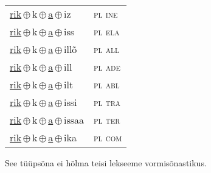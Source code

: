 \begin{minipage}{\textwidth}
\begin{sideways}
\begin{tabular}{l l}
\underline{rik}\,$\oplus$\,k\,$\oplus$\,\underline{a}\,$\oplus$\,iz & \textsc{ pl ine } \\
\underline{rik}\,$\oplus$\,k\,$\oplus$\,\underline{a}\,$\oplus$\,iss & \textsc{ pl ela } \\
\underline{rik}\,$\oplus$\,k\,$\oplus$\,\underline{a}\,$\oplus$\,illõ & \textsc{ pl all } \\
\underline{rik}\,$\oplus$\,k\,$\oplus$\,\underline{a}\,$\oplus$\,ill & \textsc{ pl ade } \\
\underline{rik}\,$\oplus$\,k\,$\oplus$\,\underline{a}\,$\oplus$\,ilt & \textsc{ pl abl } \\
\underline{rik}\,$\oplus$\,k\,$\oplus$\,\underline{a}\,$\oplus$\,issi & \textsc{ pl tra } \\
\underline{rik}\,$\oplus$\,k\,$\oplus$\,\underline{a}\,$\oplus$\,issaa & \textsc{ pl ter } \\
\underline{rik}\,$\oplus$\,k\,$\oplus$\,\underline{a}\,$\oplus$\,ika & \textsc{ pl com } \\
\end{tabular}
\end{sideways}
\label{tab:tüüpsõnamall-rikaz}

\end{minipage}

 
\vspace{1em}
\noindent See tüüpsõna ei hõlma teisi lekseeme vormi\-sõnastikus.
